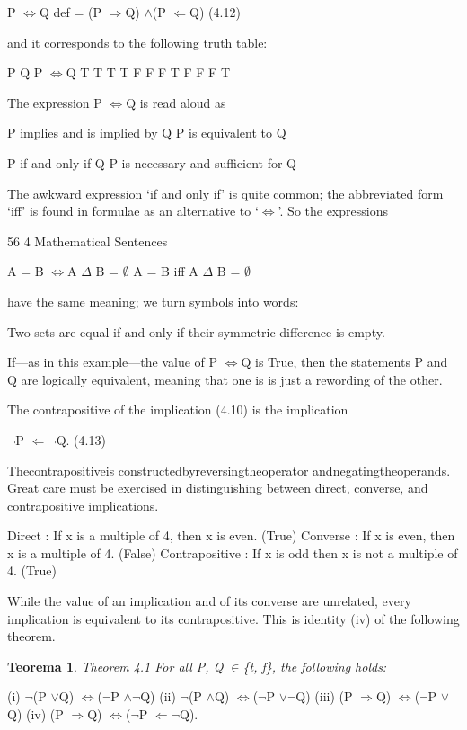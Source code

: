 \documentclass[11pt]{article}
\theoremstyle{plain}
\newtheorem{theorem}{Teorema}[section]
\theoremstyle{definition}
\begin{document}
P $\Leftrightarrow$Q def = (P $\Rightarrow$Q) $\land$(P $\Leftarrow$Q) (4.12)

and it corresponds to the following truth table:

P Q P $\Leftrightarrow$Q T T T T F F F T F F F T

The expression P $\Leftrightarrow$Q is read aloud as

P implies and is implied by Q P is equivalent to Q

P if and only if Q P is necessary and sufficient for Q

The awkward expression `if and only if' is quite common; the abbreviated form `iff' is found in formulae as an alternative to `$\Leftrightarrow$'. So the expressions

56 4 Mathematical Sentences

A = B $\Leftrightarrow$A $\Delta$ B = $\emptyset$ A = B iff A $\Delta$ B = $\emptyset$

have the same meaning; we turn symbols into words:

Two sets are equal if and only if their symmetric difference is empty.

If---as in this example---the value of P $\Leftrightarrow$Q is True, then the statements P and Q are logically equivalent, meaning that one is is just a rewording of the other.

The contrapositive of the implication (4.10) is the implication

$\neg$P $\Leftarrow$$\neg$Q. (4.13)

Thecontrapositiveis constructedbyreversingtheoperator andnegatingtheoperands. Great care must be exercised in distinguishing between direct, converse, and contrapositive implications.

Direct : If x is a multiple of 4, then x is even. (True) Converse : If x is even, then x is a multiple of 4. (False) Contrapositive : If x is odd then x is not a multiple of 4. (True)

While the value of an implication and of its converse are unrelated, every implication is equivalent to its contrapositive. This is identity (iv) of the following theorem.

\begin{theorem}
Theorem 4.1 For all P, Q $\in$\{t, f\}, the following holds:
\end{theorem}

(i) $\neg$(P $\lor$Q) $\Leftrightarrow$($\neg$P $\land$$\neg$Q) (ii) $\neg$(P $\land$Q) $\Leftrightarrow$($\neg$P $\lor$$\neg$Q) (iii) (P $\Rightarrow$Q) $\Leftrightarrow$($\neg$P $\lor$Q) (iv) (P $\Rightarrow$Q) $\Leftrightarrow$($\neg$P $\Leftarrow$$\neg$Q).
\end{document}
